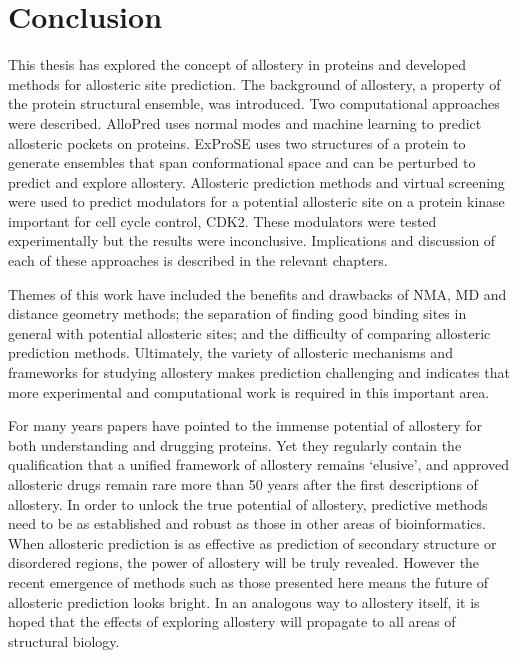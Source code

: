 \chapter{Conclusion}
\label{cha:conclusion}

This thesis has explored the concept of allostery in proteins and developed methods for allosteric site prediction.
The background of allostery, a property of the protein structural ensemble, was introduced.
Two computational approaches were described.
AlloPred uses normal modes and machine learning to predict allosteric pockets on proteins.
ExProSE uses two structures of a protein to generate ensembles that span conformational space and can be perturbed to predict and explore allostery.
Allosteric prediction methods and virtual screening were used to predict modulators for a potential allosteric site on a protein kinase important for cell cycle control, CDK2.
These modulators were tested experimentally but the results were inconclusive.
Implications and discussion of each of these approaches is described in the relevant chapters.

Themes of this work have included the benefits and drawbacks of NMA, MD and distance geometry methods; the separation of finding good binding sites in general with potential allosteric sites; and the difficulty of comparing allosteric prediction methods.
Ultimately, the variety of allosteric mechanisms and frameworks for studying allostery makes prediction challenging and indicates that more experimental and computational work is required in this important area.

For many years papers have pointed to the immense potential of allostery for both understanding and drugging proteins.
Yet they regularly contain the qualification that a unified framework of allostery remains `elusive', and approved allosteric drugs remain rare more than 50 years after the first descriptions of allostery.
In order to unlock the true potential of allostery, predictive methods need to be as established and robust as those in other areas of bioinformatics.
When allosteric prediction is as effective as prediction of secondary structure or disordered regions, the power of allostery will be truly revealed.
However the recent emergence of methods such as those presented here means the future of allosteric prediction looks bright.
In an analogous way to allostery itself, it is hoped that the effects of exploring allostery will propagate to all areas of structural biology.
